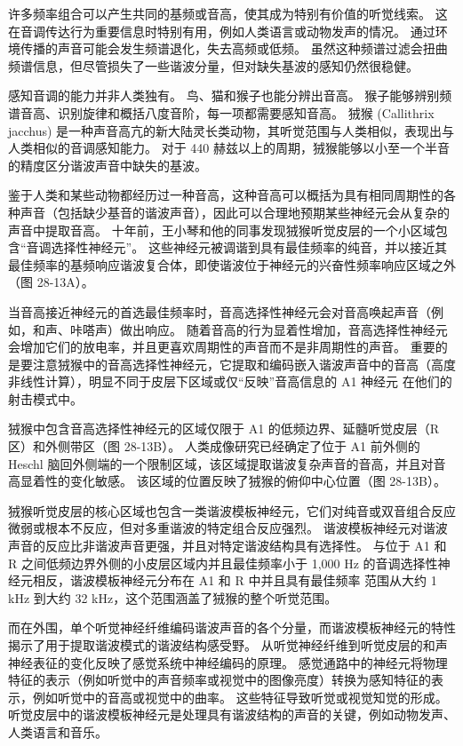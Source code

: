 许多频率组合可以产生共同的基频或音高，使其成为特别有价值的听觉线索。 这在音调传达行为重要信息时特别有用，例如人类语言或动物发声的情况。 通过环境传播的声音可能会发生频谱退化，失去高频或低频。 虽然这种频谱过滤会扭曲频谱信息，但尽管损失了一些谐波分量，但对缺失基波的感知仍然很稳健。

感知音调的能力并非人类独有。 鸟、猫和猴子也能分辨出音高。 猴子能够辨别频谱音高、识别旋律和概括八度音阶，每一项都需要感知音高。 狨猴 (Callithrix jacchus) 是一种声音高亢的新大陆灵长类动物，其听觉范围与人类相似，表现出与人类相似的音调感知能力。 对于 440 赫兹以上的周期，狨猴能够以小至一个半音的精度区分谐波声音中缺失的基波。

鉴于人类和某些动物都经历过一种音高，这种音高可以概括为具有相同周期性的各种声音（包括缺少基音的谐波声音），因此可以合理地预期某些神经元会从复杂的声音中提取音高。 十年前，王小琴和他的同事发现狨猴听觉皮层的一个小区域包含“音调选择性神经元”。 这些神经元被调谐到具有最佳频率的纯音，并以接近其最佳频率的基频响应谐波复合体，即使谐波位于神经元的兴奋性频率响应区域之外（图 28-13A）。

当音高接近神经元的首选最佳频率时，音高选择性神经元会对音高唤起声音（例如，和声、咔嗒声）做出响应。 随着音高的行为显着性增加，音高选择性神经元会增加它们的放电率，并且更喜欢周期性的声音而不是非周期性的声音。 重要的是要注意狨猴中的音高选择性神经元，它提取和编码嵌入谐波声音中的音高（高度非线性计算），明显不同于皮层下区域或仅“反映”音高信息的 A1 神经元 在他们的射击模式中。

狨猴中包含音高选择性神经元的区域仅限于 A1 的低频边界、延髓听觉皮层（R 区）和外侧带区（图 28-13B）。 人类成像研究已经确定了位于 A1 前外侧的 Heschl 脑回外侧端的一个限制区域，该区域提取谐波复杂声音的音高，并且对音高显着性的变化敏感。 该区域的位置反映了狨猴的俯仰中心位置（图 28-13B）。

狨猴听觉皮层的核心区域也包含一类谐波模板神经元，它们对纯音或双音组合反应微弱或根本不反应，但对多重谐波的特定组合反应强烈。 谐波模板神经元对谐波声音的反应比非谐波声音更强，并且对特定谐波结构具有选择性。 与位于 A1 和 R 之间低频边界外侧的小皮层区域内并且最佳频率小于 1,000 Hz 的音调选择性神经元相反，谐波模板神经元分布在 A1 和 R 中并且具有最佳频率 范围从大约 1 kHz 到大约 32 kHz，这个范围涵盖了狨猴的整个听觉范围。

而在外围，单个听觉神经纤维编码谐波声音的各个分量，而谐波模板神经元的特性揭示了用于提取谐波模式的谐波结构感受野。 从听觉神经纤维到听觉皮层的和声神经表征的变化反映了感觉系统中神经编码的原理。 感觉通路中的神经元将物理特征的表示（例如听觉中的声音频率或视觉中的图像亮度）转换为感知特征的表示，例如听觉中的音高或视觉中的曲率。 这些特征导致听觉或视觉知觉的形成。 听觉皮层中的谐波模板神经元是处理具有谐波结构的声音的关键，例如动物发声、人类语言和音乐。


